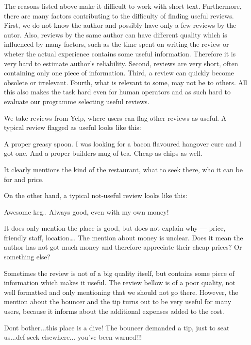 The reasons listed above make it difficult to work with short text.
Furthermore, there are many factors contributing to the difficulty of finding useful reviews.
First, we do not know the author and possibly have only a few reviews by the autor.
Also, reviews by the same author can have different quality which is influenced by many factors,
such as the time spent on writing the review or wheter the actual experience contains some useful information.
Therefore it is very hard to estimate author's reliability.
Second, reviews are very short, often containing only one piece of information.
Third, a review can quickly become obsolete or irrelevant.
Fourth, what is relevant to some, may not be to others.
All this also makes the task hard even for human operators and as such hard to evaluate our programme selecting useful reviews.

We take reviews from Yelp, where users can flag other reviews as useful.
A typical review flagged as useful looks like this:

\begin{code}
A proper greasy spoon.
I was looking for a bacon flavoured hangover cure and I got one.
And a proper builders mug of tea.
Cheap as chips as well.
\end{code}

It clearly mentions the kind of the restaurant, what to seek there,
who it can be for and price.

On the other hand, a typical not-useful review looks like this:

\begin{code}
Awesome keg.. Always good, even with my own money!
\end{code}

It does only mention the place is good, but does not explain why --- price, friendly staff, location\dots.
The mention about money is unclear.
Does it mean the author has not got much money and therefore appreciate their cheap prices? Or something else?

Sometimes the review is not of a big quality itself, but contains some piece of information which makes it useful.
The review bellow is of a poor quality, not well formatted and only mentioning that we should not go there.
However, the mention about the bouncer and the tip turns out to be very useful for many users,
because it informs about the additional expenses added to the cost.

\begin{code}
Dont bother...this place is a dive!
The bouncer demanded a tip, just to seat us...def seek elsewhere...
you've been warned!!!
\end{code}


